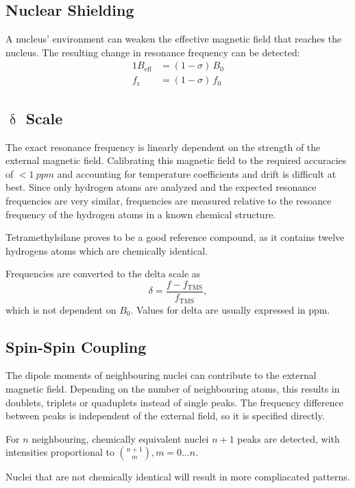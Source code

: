 \subsection{Nuclear Shielding}
A nucleus' environment can weaken the effective magnetic field that reaches the nucleus.
The resulting change in resonance frequency can be detected:
\begin{alignat*}{1}
	B_\text{eff} &= \left(1 - \sigma \right) \, B_0\\
	f_\text{r} &= \left(1 - \sigma \right) \, f_0
\end{alignat*}

\subsection{$\updelta$ Scale}
The exact resonance frequency is linearly dependent on the strength of the external magnetic field.
Calibrating this magnetic field to the required accuracies of $< \SI{1}{ppm}$ and accounting for temperature coefficients and drift is difficult at best.
Since only hydrogen atoms are analyzed and the expected resonance frequencies are very similar, frequencies are measured relative to the resoance frequency of the hydrogen atoms in a known chemical structure.

Tetramethylsilane proves to be a good reference compound, as it contains twelve hydrogens atoms which are chemically identical.

Frequencies are converted to the delta scale as
\begin{equation*}
	\delta = \frac{f - f_\text{TMS}}{f_\text{TMS}},
\end{equation*}
which is not dependent on $B_0$.
Values for delta are usually expressed in \si{ppm}.

\subsection{Spin-Spin Coupling}
The dipole moments of neighbouring nuclei can contribute to the external magnetic field.
Depending on the number of neighbouring atoms, this results in doublets, triplets or quaduplets instead of single peaks.
The frequency difference between peaks is independent of the external field, so it is specified directly.

For $n$ neighbouring, chemically equivalent nuclei $n + 1$ peaks are detected, with intensities proportional to ${{n + 1}\choose{m}}, m = 0 \dots n$.

Nuclei that are not chemically identical will result in more compliacated patterns.
